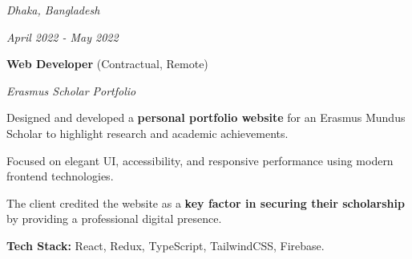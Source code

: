 
    \vspace{0.2 cm}

    \begin{twocolentry}{
    \textit{Dhaka, Bangladesh}
        
    \textit{April 2022 - May 2022}}
        \textbf{Web Developer} (Contractual, Remote)
        
        \textit{Erasmus Scholar Portfolio}
    \end{twocolentry}

    \vspace{0.10 cm}
    \begin{onecolentry}
        \begin{highlights}
            \item Designed and developed a \textbf{personal portfolio website} for an Erasmus Mundus Scholar to highlight research and academic achievements.
            \item Focused on elegant UI, accessibility, and responsive performance using modern frontend technologies.
            \item The client credited the website as a \textbf{key factor in securing their scholarship} by providing a professional digital presence.
            \item  \textbf{Tech Stack:} React, Redux, TypeScript, TailwindCSS, Firebase.
        \end{highlights}
    \end{onecolentry}
